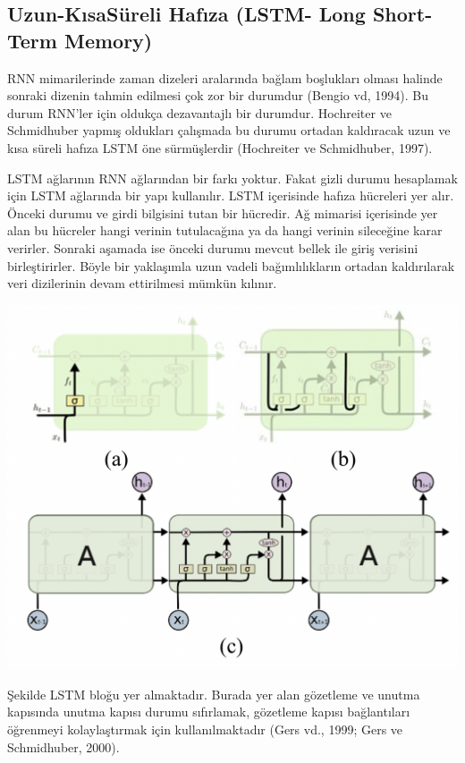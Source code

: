 \documentclass{article}
\begin{document}
\newpage
\begin{multicols}{2}
\subsection{Uzun-KısaSüreli Hafıza (LSTM- Long
Short-Term Memory)}

RNN mimarilerinde zaman dizeleri aralarında
bağlam boşlukları olması halinde sonraki dizenin
tahmin edilmesi çok zor bir durumdur (Bengio
vd, 1994). Bu durum RNN’ler için oldukça
dezavantajlı bir durumdur. Hochreiter ve
Schmidhuber yapmış oldukları çalışmada bu
durumu ortadan kaldıracak uzun ve kısa süreli hafıza LSTM öne sürmüşlerdir (Hochreiter ve
Schmidhuber, 1997).

LSTM ağlarının RNN ağlarından bir farkı
yoktur. Fakat gizli durumu hesaplamak için
LSTM ağlarında bir yapı kullanılır. LSTM
içerisinde hafıza hücreleri yer alır. Önceki
durumu ve girdi bilgisini tutan bir hücredir. Ağ
mimarisi içerisinde yer alan bu hücreler hangi
verinin tutulacağına ya da hangi verinin
sileceğine karar verirler. Sonraki aşamada ise
önceki durumu mevcut bellek ile giriş verisini
birleştirirler. Böyle bir yaklaşımla uzun vadeli
bağımlılıkların ortadan kaldırılarak veri
dizilerinin devam ettirilmesi mümkün kılınır.

\vspace{5pt}
\begin{minipage}{\linewidth}
    \includegraphics[width=0.8\linewidth]{unutmakatmani.png} 
    \label{fig:Şekil 6}
\end{minipage}

\vspace{10pt}
    Şekilde LSTM bloğu yer almaktadır. Burada
yer alan gözetleme ve unutma kapısında unutma
kapısı durumu sıfırlamak, gözetleme kapısı
bağlantıları öğrenmeyi kolaylaştırmak için
kullanılmaktadır (Gers vd., 1999; Gers ve
Schmidhuber, 2000). 


\end{multicols}
\end{document}
